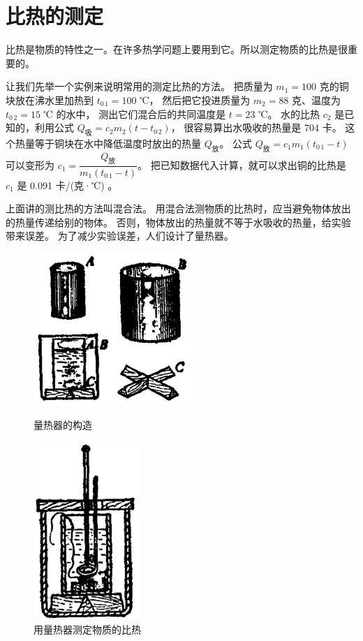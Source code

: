 \section{比热的测定}\label{sec:3-5}

比热是物质的特性之一。在许多热学问题上要用到它。所以测定物质的比热是很重要的。

\begin{enhancedline}[1ex]
让我们先举一个实例来说明常用的测定比热的方法。
把质量为 $m_1 = 100$ 克的铜块放在沸水里加热到 $t_{0\,1} = 100$ ℃，
然后把它投进质量为 $m_2 = 88$ 克、温度为 $t_{0\,2} = 15$ ℃ 的水中，
测出它们混合后的共同温度是 $t = 23$ ℃。
水的比热 $c_2$ 是已知的，利用公式 $Q_\text{吸} = c_2m_2(t - t_{0\,2})$，
很容易算出水吸收的热量是 704 卡。
这个热量等于铜块在水中降低温度时放出的热量 $Q_\text{放}$。
公式 $Q_\text{放} = c_1m_1(t_{0\,1} - t)$ 可以变形为
$c_1 = \dfrac{Q_\text{放}}{m_1(t_{0\,1} - t)}$。
把已知数据代入计算，就可以求出铜的比热是 $c_1$ 是 0.091 卡/(克·℃) 。
\end{enhancedline}

上面讲的测比热的方法叫混合法。
用混合法测物质的比热时，应当避免物体放出的热量传递给别的物体。
否则，物体放出的热量就不等于水吸收的热量，给实验带来误差。
为了减少实验误差，人们设计了量热器。

\begin{figure}[htbp]
    \centering
    \begin{minipage}{7cm}
    \centering
    \vspace{1cm}
    \includegraphics[width=6cm]{../pic/czwl2-ch3-2}
    \caption{量热器的构造}\label{fig:3-2}
    \end{minipage}
    \qquad
    \begin{minipage}{7cm}
    \centering
    \includegraphics[width=4cm]{../pic/czwl2-ch3-3}
    \caption{用量热器测定物质的比热}\label{fig:3-3}
    \end{minipage}
\end{figure}

